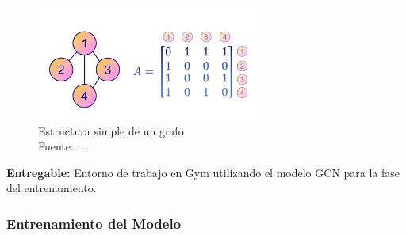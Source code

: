 \begin{figure}[h]
	\begin{center}
		\includegraphics[width=0.65\textwidth]{3/figures/grafosim.jpg}
		\caption[Estructura simple de un grafo]{Estructura simple de un grafo\\
			Fuente: \citep*{gl_gnnmed}. .}
		\label{1:fig}
	\end{center}
\end{figure}
\medskip
\textbf{Entregable:} Entorno de trabajo en Gym utilizando el modelo GCN para la fase del entrenamiento.

\subsubsection{Entrenamiento del Modelo}

